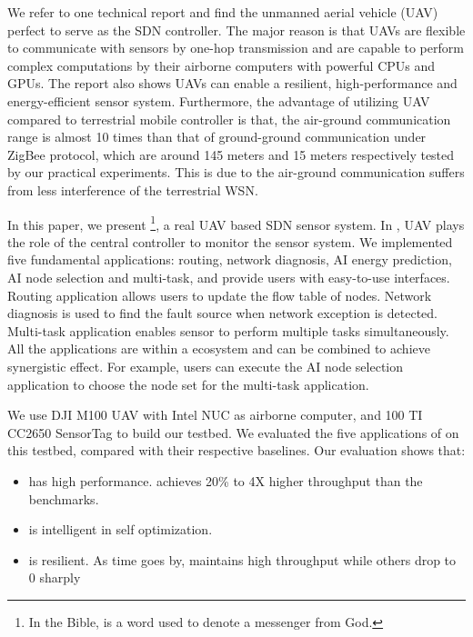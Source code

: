 We refer to one technical report \cite{}
and find the unmanned aerial vehicle (UAV) 
\cite{Cambone2005Unmanned, Perry2000Unmanned, Cathcart2014Method}
perfect to serve as the SDN controller.
The major reason is that UAVs are flexible to 
communicate with sensors by one-hop transmission
and are capable to perform complex computations 
by their airborne computers with powerful CPUs and GPUs.
The report also shows UAVs can enable a resilient, 
high-performance and energy-efficient sensor system.
Furthermore, the advantage of utilizing UAV compared to
terrestrial mobile controller is that, the air-ground communication range
is almost 10 times than that of ground-ground communication under ZigBee protocol, which are
around 145 meters and 15 meters respectively tested by our practical experiments.
This is due to the air-ground communication suffers from less interference of the terrestrial WSN.

In this paper, we present {\sdn}\footnote{In the Bible, {\sdn} is a word used to denote a messenger from God. }, 
a real UAV based SDN sensor system.
In {\sdn}, UAV plays the role of the central controller to monitor the sensor system.
We implemented five fundamental applications: routing, network diagnosis, 
AI energy prediction, AI node selection and multi-task,
and provide users with easy-to-use interfaces.
Routing application allows users to update the flow table of nodes.
Network diagnosis is used to find the fault source when network exception is detected.
Multi-task application enables sensor to perform multiple 
tasks simultaneously. All the applications are within a ecosystem
and can be combined to achieve synergistic effect. For example,
users can execute the AI node selection application to choose
the node set for the multi-task application. 


We use DJI M100 UAV with Intel NUC as airborne computer, 
and 100 TI CC2650 SensorTag to build our testbed.
We evaluated the five applications of  {\sdn} on this testbed, 
compared with their respective baselines.
Our evaluation shows that:
\begin{itemize}
\item[1)] {\sdn} has high performance. {\sdn}  achieves 20\% to 4X higher throughput than the benchmarks. 
\item[2)] {\sdn} is intelligent in self optimization.  {\sdn} 
\item[3)] {\sdn} is resilient. As time goes by, {\sdn} maintains high throughput while others drop to $0$ sharply
\end{itemize}

